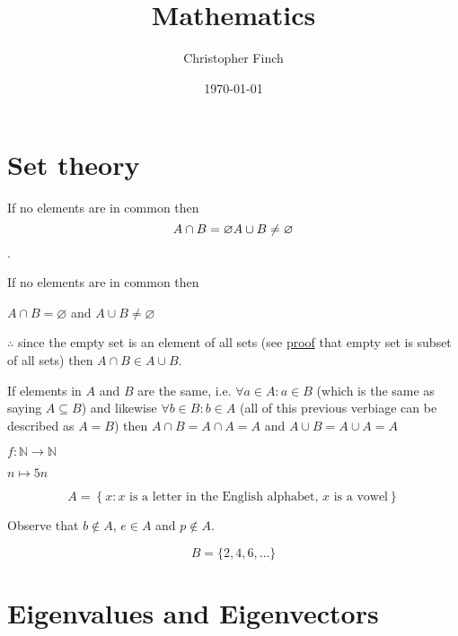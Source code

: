\documentclass[openany]{scrbook}
\title{Mathematics}
\author{Christopher Finch}
\date{\today}
\newcommand{\filler}{\blindtext[1]}
\begin{document}
\frontmatter
\maketitle
\tableofcontents

\mainmatter
{}
\filler

\chapter{Set theory}

If no elements are in common then  
\begin{equation*}
A \cap B = \varnothing \\
A \cup B \neq \varnothing
\end{equation*}.

If no elements are in common then
\begin{center}
$ A \cap B = \varnothing $ and $ A \cup B \neq \varnothing $
\end{center}

$\therefore$ since the empty set is an element of all sets (see \href{https://proofwiki.org/wiki/Empty_Set_is_Subset_of_All_Sets}{proof} that empty set is subset of all sets) then $ A\cap B \in A \cup B $.

If elements in $A$ and $B$ are the same, i.e. $ \forall a \in A : a \in B $ (which is the same as saying $A \subseteq B$) and likewise $ \forall b \in B : b \in A $ (all of this previous verbiage can be described as $A = B$) then $A \cap B = A\cap A = A $ and $A\cup B = A\cup A = A$


$ f:\mathbb N\to\mathbb N $

$n\mapsto5n$

\[A=\left\{x:x \text{ is a letter in the English alphabet, }x \text{ is a vowel} \right\}\]

Observe that $b \notin A$, $e \in A$ and $p \notin A$.

\[B=\{2,4,6,\dots \}\]




\chapter{Eigenvalues and Eigenvectors}
\end{document}
